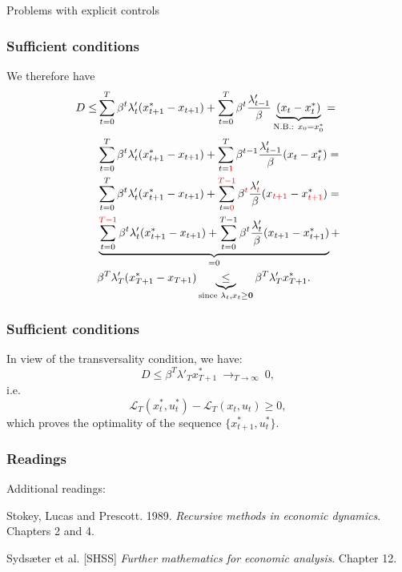 \documentclass[10pt]{beamer}
\theoremstyle{definition}
\begin{document}
\begin{section}{Problems with explicit controls}
\begin{frame}[fragile]
\frametitle{Sufficient conditions}
We therefore have \begin{equation*}
\begin{split}
 D \leq &   \sum_{t=0}^{T}\beta^t \lambda'_t  (x^*_{t+1} - x_{t+1} ) +  \sum_{t=0}^{T}\beta^t \frac{\lambda'_{t-1}}{\beta}\underbrace{(x_t-x_t^*)}_{\text{N.B.: } x_0 = x^*_0} = \\
&  \sum_{t=0}^{T}\beta^t \lambda'_t  (x^*_{t+1} - x_{t+1} ) +  \sum_{t = {\color{red}1}}^{T}\beta^{t-1} \frac{\lambda'_{t-1}}{\beta}(x_t-x_t^*)= \\
&  \sum_{t=0}^{T}\beta^t \lambda'_t  (x^*_{t+1} - x_{t+1} ) +  \sum_{t = {\color{red} 0}}^{{\color{red} T-1}}\beta^{{\color{red} t}} \frac{\lambda'_{{\color{red} t}}}{\beta}(x_{{\color{red} t+1}}-x_{{\color{red} t+1}}^*)= \\
& \underbrace{\sum_{t=0}^{{\color{red} T-1}}\beta^t \lambda'_t  (x^*_{t+1} - x_{t+1}) +  \sum_{t = 0}^{T-1}\beta^{t} \frac{\lambda'_{t}}{\beta}(x_{ t+1}-x_{t+1}^*)}_{=0} + \\
& \beta^T \lambda'_T  (x^*_{T+1} - x_{T+1})  \underbrace{\leq}_{\text{since }\lambda_t,x_t \geq \mathbf{0}} \beta^T \lambda'_T  x^*_{T+1}.
\end{split}
\end{equation*}
\end{frame}


\begin{frame}[fragile]
\frametitle{Sufficient conditions}
In view of the transversality condition, we have: \begin{equation*}
 D \leq  \beta^T \lambda'_T  x^*_{T+1} ~ \mathop{\longrightarrow}_{T \rightarrow \infty} ~0 ,
\end{equation*}
i.e. 
\[  \mathcal{L}_T(x^*_t,u^*_t) - \mathcal{L}_T (x_t,u_t) \geq 0, \] which proves the optimality of the sequence
$\{x^*_{t+1},u^*_t\}$.
\end{frame}
\end{section}

%


\begin{frame}[fragile]
\frametitle{Readings}
Additional readings:\bigskip

Stokey, Lucas and Prescott. 1989. \emph{Recursive methods in economic dynamics}. Chapters 2 and 4.\bigskip

Syds\ae{}ter et al. [SHSS] \emph{Further mathematics for economic analysis}. Chapter 12.\bigskip
\end{frame}
\end{document}
